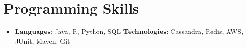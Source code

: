 \documentclass[letterpaper,11pt]{article}
\newcommand{\resumeSubHeadingListStart}{\begin{itemize}[leftmargin=*]}
\newcommand{\resumeSubHeadingListEnd}{\end{itemize}}
\begin{document}

\section{Programming Skills}
  \resumeSubHeadingListStart
    \item[]{
      \textbf{Languages}{: Java, R, Python, SQL}
      \hfill
      \textbf{Technologies}{: Cassandra, Redis, AWS, JUnit, Maven, Git}
    }
  \resumeSubHeadingListEnd


\end{document}
